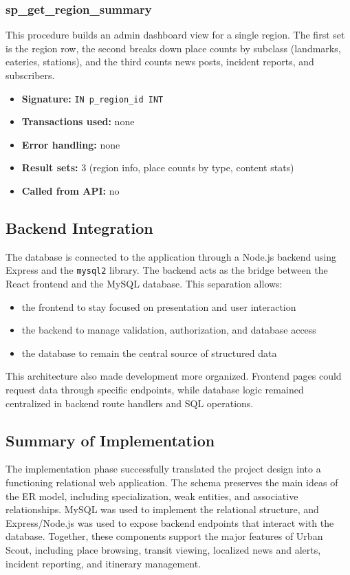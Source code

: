 \subsubsection{sp\_get\_region\_summary}

This procedure builds an admin dashboard view for a single region. The first set is the region row, the second breaks down place counts by subclass (landmarks, eateries, stations), and the third counts news posts, incident reports, and subscribers.

\begin{itemize}
    \item \textbf{Signature:} \texttt{IN p\_region\_id INT}
    \item \textbf{Transactions used:} none
    \item \textbf{Error handling:} none
    \item \textbf{Result sets:} 3 (region info, place counts by type, content stats)
    \item \textbf{Called from API:} no
\end{itemize}

\subsection{Backend Integration}

The database is connected to the application through a Node.js backend using Express and the \texttt{mysql2} library. The backend acts as the bridge between the React frontend and the MySQL database. This separation allows:
\begin{itemize}
    \item the frontend to stay focused on presentation and user interaction
    \item the backend to manage validation, authorization, and database access
    \item the database to remain the central source of structured data
\end{itemize}

This architecture also made development more organized. Frontend pages could request data through specific endpoints, while database logic remained centralized in backend route handlers and SQL operations.

\subsection{Summary of Implementation}

The implementation phase successfully translated the project design into a functioning relational web application. The schema preserves the main ideas of the ER model, including specialization, weak entities, and associative relationships. MySQL was used to implement the relational structure, and Express/Node.js was used to expose backend endpoints that interact with the database. Together, these components support the major features of Urban Scout, including place browsing, transit viewing, localized news and alerts, incident reporting, and itinerary management.
